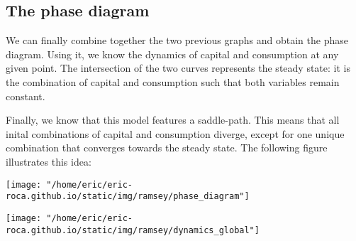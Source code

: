 \documentclass[11pt,a4paper,english]{article}
\begin{document}
\subsection{The phase diagram}

We can finally combine together the two previous graphs and obtain the phase diagram.
Using it, we know the dynamics of capital and consumption at any given point.
The intersection of the two curves represents the steady state: it is the combination of capital and consumption such that both variables remain constant.

Finally, we know that this model features a saddle-path.
This means that all inital combinations of capital and consumption diverge, except for one unique combination that converges towards the steady state.
The following figure illustrates this idea:

\vspace{1em}
\begin{minipage}{0.45\textwidth}
\centering
\texttt{[image: "/home/eric/eric-roca.github.io/static/img/ramsey/phase\_diagram"]}
\end{minipage}
\hfill
\begin{minipage}{0.45\textwidth}
\centering
\texttt{[image: "/home/eric/eric-roca.github.io/static/img/ramsey/dynamics\_global"]}
\end{minipage}
\end{document}
